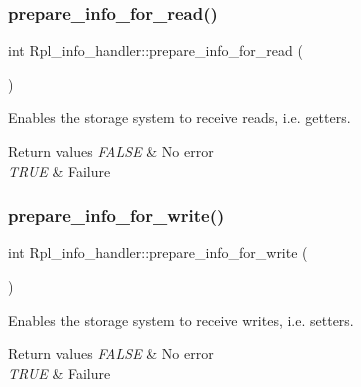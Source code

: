 \subsubsection{\texorpdfstring{prepare\+\_\+info\+\_\+for\+\_\+read()}{prepare\_info\_for\_read()}}
{\footnotesize\ttfamily int Rpl\+\_\+info\+\_\+handler\+::prepare\+\_\+info\+\_\+for\+\_\+read (\begin{DoxyParamCaption}{ }\end{DoxyParamCaption})\hspace{0.3cm}{\ttfamily [inline]}}

Enables the storage system to receive reads, i.\+e. getters.


\begin{DoxyRetVals}{Return values}
{\em F\+A\+L\+SE} & No error \\
\hline
{\em T\+R\+UE} & Failure \\
\hline
\end{DoxyRetVals}
\mbox{\label{classRpl__info__handler_acd0304690a9d5f21c797915173ee32ab}} 
\subsubsection{\texorpdfstring{prepare\+\_\+info\+\_\+for\+\_\+write()}{prepare\_info\_for\_write()}}
{\footnotesize\ttfamily int Rpl\+\_\+info\+\_\+handler\+::prepare\+\_\+info\+\_\+for\+\_\+write (\begin{DoxyParamCaption}{ }\end{DoxyParamCaption})\hspace{0.3cm}{\ttfamily [inline]}}

Enables the storage system to receive writes, i.\+e. setters.


\begin{DoxyRetVals}{Return values}
{\em F\+A\+L\+SE} & No error \\
\hline
{\em T\+R\+UE} & Failure \\
\hline
\end{DoxyRetVals}
\mbox{\label{classRpl__info__handler_aa734fb150f1127b83d2f91fbc00a43d2}} 
